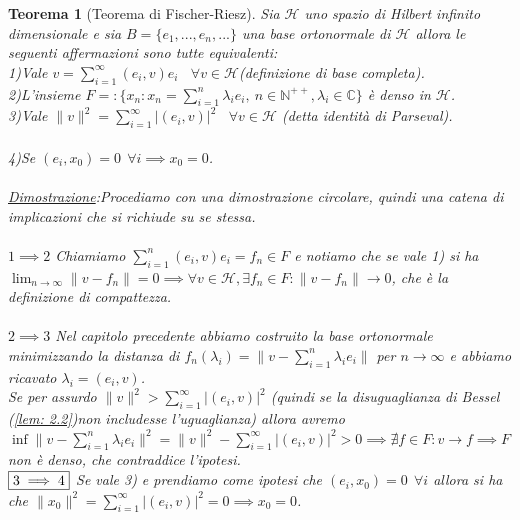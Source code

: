 \documentclass[a4paper,12pt]{report}
\newtheorem{teorema}{Teorema}[chapter]
\newcommand{\gt}{>}
\begin{document}
\begin{teorema}[Teorema di Fischer-Riesz]\label{thm: 2.7}
    Sia $\mathscr{H}$ uno spazio di Hilbert infinito dimensionale e sia $B=\{e_1,...,e_n,...\}$ una base ortonormale di $\mathscr{H}$ allora le seguenti affermazioni sono tutte equivalenti:
    \\ 1)Vale $v=\displaystyle\sum_{i=1}^{\infty}(e_i,v)e_i \ \ \ \ \forall v \in \mathscr{H}$(definizione di base completa).
    \\ 2)L'insieme $F=:\bigg\{x_n: x_n=\displaystyle\sum_{i=1}^n\lambda_ie_i, \ n\in \mathbb{N}^{++}, \lambda_i \in \mathbb{C}\bigg\}$ è denso in $\mathscr{H}$.
    \\ 3)Vale $\|v\|^2=\displaystyle\sum_{i =1}^{\infty}|(e_i,v)|^2 \ \ \ \ \forall v \in \mathscr{H}$ (detta identità di Parseval).
    \\
    \\ 4)Se $(e_i,x_0)=0 \ \ \forall i \implies x_0=0$.
    \\
    \\ \underline{Dimostrazione}:Procediamo con una dimostrazione circolare, quindi una catena di implicazioni che si richiude su se stessa.
    \\
    \\ $\boxed{1 \implies 2}$ Chiamiamo $\displaystyle\sum_{i=1}^n(e_i,v)e_i=f_n \in F$ e notiamo che se vale 1) si ha $\displaystyle\lim_{n\to\infty}\|v-f_n\|=0 \implies \forall v \in \mathscr{H}, \exists f_n\in F:\|v-f_n\| \to 0$, che è la definizione di compattezza.
    \\
    \\ $\boxed{2 \implies 3}$ Nel capitolo precedente abbiamo costruito la base ortonormale minimizzando la distanza di $f_n(\lambda_i)=\bigg\|v-\displaystyle\sum_{i=1}^n\lambda_ie_i\bigg\|$ per $n\to \infty$ e abbiamo ricavato $\lambda_i=(e_i,v)$. 
    \\Se per assurdo $\|v\|^2\gt \displaystyle\sum_{i=1}^{\infty}|(e_i,v)|^2$ (quindi se la disuguaglianza di Bessel (\ref{lem: 2.2})non includesse l'uguaglianza) allora avremo $\inf\bigg\|v-\displaystyle\sum_{i=1}^n\lambda_ie_i\bigg\|^2=\|v\|^2-\sum_{i=1}^{\infty}|(e_i,v)|^2 \gt0 \implies \nexists f\in F:v \to f \implies F$ non è denso, che contraddice l'ipotesi.
    \\
    $\\\boxed{3 \implies 4}$ Se vale 3) e prendiamo come ipotesi che $(e_i,x_0)=0 \ \ \forall i $ allora si ha che $\|x_0\|^2=\displaystyle\sum_{i=1}^{\infty}|(e_i,v)|^2=0 \implies x_0=0$.
    \\

\end{teorema}
\end{document}
